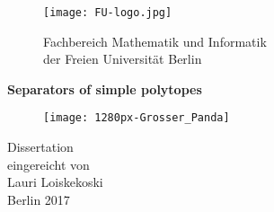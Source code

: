 \documentclass[a4paper,12pt]{book}
\theoremstyle{plain}
\theoremstyle{definition}
\begin{document}
\pagestyle{empty}

\begin{titlepage}
\setlength{\hoffset}{5mm}
\begin{center}
\begin{figure}[h]
\begin{minipage}{.35\textwidth}
\begin{center}
\texttt{[image: FU-logo.jpg]}
\end{center}
\end{minipage}
\begin{minipage}{.64\textwidth}
\large {Fachbereich Mathematik und Informatik\\
der Freien Universit\"at Berlin}
\end{minipage}
\end{figure}

\vspace{1.5cm}
\LARGE{\bf{
Separators of simple polytopes}}\\

\vspace{1cm}
\begin{figure}[h]
\begin{center}

\texttt{[image: 1280px-Grosser\_Panda]}

\end{center}
\end{figure}
\vspace{0.5cm}
\LARGE{
{Dissertation}\\}
\large
\vspace{1cm}
eingereicht von\\
Lauri Loiskekoski\\
\vspace{1.5cm}
Berlin 2017\\
\vspace{3cm}
\end{center}
\end{titlepage}

\cleardoublepage\thispagestyle{empty}
\end{document}
